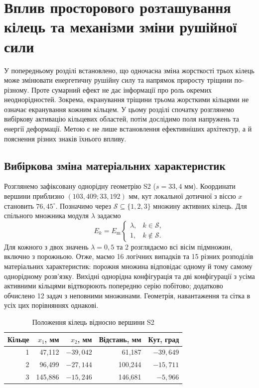 \chapter{Вплив просторового розташування кілець та механізми зміни рушійної сили}
\label{ch:ring-placement}

У попередньому розділі встановлено, що одночасна зміна жорсткості трьох кілець може змінювати енергетичну рушійну силу та напрямок приросту тріщини по-різному. Проте сумарний ефект не дає інформації про роль окремих неоднорідностей. Зокрема, екранування тріщини трьома жорсткими кільцями не означає екранування кожним кільцем. У цьому розділі спочатку розглянемо вибіркову активацію кільцевих областей, потім дослідимо поля напружень та енергії деформації. Метою є не лише встановлення ефективніших архітектур, а й пояснення різних знаків їхнього впливу.

\section{Вибіркова зміна матеріальних характеристик}
\label{sec:ring-design}

Розглянемо зафіксовану однорідну геометрію S2 ($s=33{,}4$ мм). Координати вершини приблизно $(103{,}409;33{,}192)$ мм, кут локальної дотичної з віссю $x$ становить $76{,}45^\circ$. Позначимо через $\mathcal S\subseteq\{1,2,3\}$ множину активних кілець. Для спільного множника модуля $\lambda$ задаємо
\begin{equation}
 E_k=E_{\mathrm m}\begin{cases}
 \lambda,&k\in\mathcal S,\\
 1,&k\notin\mathcal S .
 \end{cases}
 \label{eq:ring-mask}
\end{equation}
Для кожного з двох значень $\lambda=0{,}5$ та 2 розглядаємо всі вісім підмножин, включно з порожньою. Отже, маємо 16 логічних випадків та 15 різних розподілів матеріальних характеристик: порожня множина відповідає одному й тому самому однорідному розв'язку. Вихідні однорідна конфігурація та дві конфігурації з усіма активними кільцями відтворюють попередню серію побітово; додатково обчислено 12 задач з неповними множинами. Геометрія, навантаження та сітка в усіх цих порівняннях однакові.

\begin{table}[htbp]
 \centering
 \caption{Положення кілець відносно вершини S2}
 \label{tab:ring-positions}
 \begin{tabular}{rrrrr}
 \toprule
 Кільце & $x_1$, мм & $x_2$, мм & Відстань, мм & Кут, град\\
 \midrule
 1 & 47,112 & $-39,042$ & 61,187 & $-39,649$\\
 2 & 96,499 & $-27,144$ & 100,244 & $-15,711$\\
 3 & 145,886 & $-15,246$ & 146,681 & $-5,966$\\
 \bottomrule
 \end{tabular}
\end{table}

